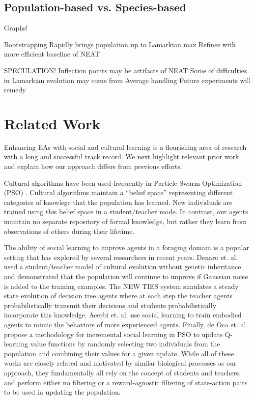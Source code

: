 \documentclass{acm_proc_article-sp}
\begin{document}
\subsection*{Population-based vs. Species-based}

Graphs!

Bootstrapping
    Rapidly brings population up to Lamarkian max
    Refines with more efficient baseline of NEAT
    
SPECULATION!
    Inflection points may be artifacts of NEAT
    Some of difficulties in Lamarkian evolution may come from Average handling
    Future experiments will remedy

\section{Related Work}
\label{sec:related}
Enhancing EAs with social and cultural learning is a flourishing area of research with a long and successful track record.
We next highlight relevant prior work and explain how our approach differs from previous efforts.

Cultural algorithms \cite{reynolds1994introduction} have been used frequently in Particle Swarm Optimization (PSO) \cite{kennedy1995particle}. Cultural algorithms maintain a ``belief space'' representing different categories of knowlege that the population has learned. New individuals are trained using this belief space in a student/teacher mode. In contrast, our agents maintain no separate repository of formal knowledge, but rather they learn from observations of others during their lifetime.

The ability of social learning to improve agents in a foraging domain is a popular setting that has explored by several researchers in recent years. Denaro et. al. \cite{denaro1996cultural} used a student/teacher model of cultural evolution without genetic inheritance and demonstrated that the population will continue to improve if Gaussian noise is added to the training examples. The NEW TIES system \cite{haasdijk2008social, vogt2010modeling} simulates a steady state evolution of decision tree agents where at each step the teacher agents probabilistically transmit their decisions and students probabilistically incorporate this knowledge. Acerbi et. al. \cite{acerbi2007social} use social learning to train embodied agents to mimic the behaviors of more experienced agents. Finally, de Oca et. al. \cite{de2011incremental} propose a methodology for incremental social learning in PSO to update Q-learning \cite{watkins1992q} value functions by randomly selecting two individuals from the population and combining their values for a given update. While all of these works are closely related and motivated by similar biological processes as our approach, they fundamentally all rely on the concept of students and teachers, and perform either no filtering or a reward-agnostic filtering of state-action pairs to be used in updating the population.
\end{document}
